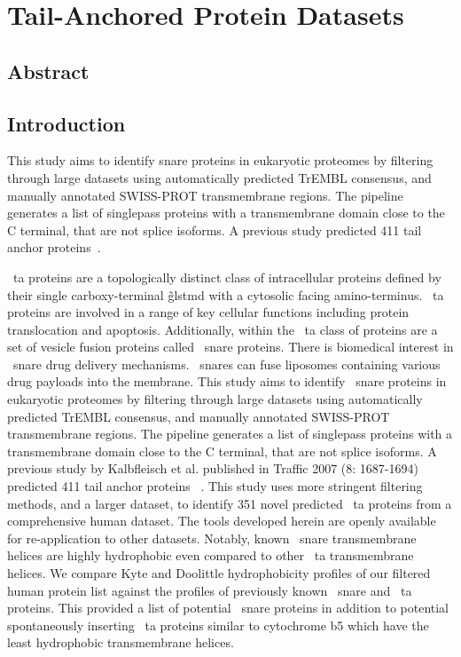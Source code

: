 \chapter{Tail-Anchored Protein Datasets}
\sloppy
\section{Abstract}

\section{Introduction}
This study aims to identify \gls{snare} proteins in eukaryotic proteomes by filtering through large datasets using automatically predicted TrEMBL consensus, and manually annotated SWISS-PROT transmembrane regions.
The pipeline generates a list of singlepass proteins with a transmembrane domain close to the C terminal, that are not splice isoforms.
A previous study predicted 411 tail anchor proteins~\cite{Kalbfleisch2007}.

~\gls{ta} proteins are a topologically distinct class of intracellular proteins defined by their single carboxy-terminal \~gls{tmd} with a cytosolic facing amino-terminus.
~\gls{ta} proteins are involved in a range of key cellular functions including protein translocation and apoptosis.
Additionally, within the ~\gls{ta} class of proteins are a set of vesicle fusion proteins called ~\gls{snare} proteins.
There is biomedical interest in ~\gls{snare} drug delivery mechanisms.
~\gls{snare}s can fuse liposomes containing various drug payloads into the membrane.
This study aims to identify ~\gls{snare} proteins in eukaryotic proteomes by filtering through large datasets using automatically predicted TrEMBL consensus, and manually annotated SWISS-PROT transmembrane regions.
The pipeline generates a list of singlepass proteins with a transmembrane domain close to the C terminal, that are not splice isoforms.
A previous study by Kalbfleisch et al.
published in Traffic 2007 (8: 1687-1694) predicted 411 tail anchor proteins ~\cite{Kalbfleisch2007}.
This study uses more stringent filtering methods, and a larger dataset, to identify 351 novel predicted ~\gls{ta} proteins from a comprehensive human dataset.
The tools developed herein are openly available for re-application to other datasets.
Notably, known ~\gls{snare} transmembrane helices are highly hydrophobic even compared to other ~\gls{ta} transmembrane helices.
We compare Kyte and Doolittle hydrophobicity profiles of our filtered human protein list against the profiles of previously known ~\gls{snare} and ~\gls{ta} proteins.
This provided a list of potential ~\gls{snare} proteins in addition to potential spontaneously inserting ~\gls{ta} proteins similar to cytochrome b5 which have the least hydrophobic transmembrane helices.


